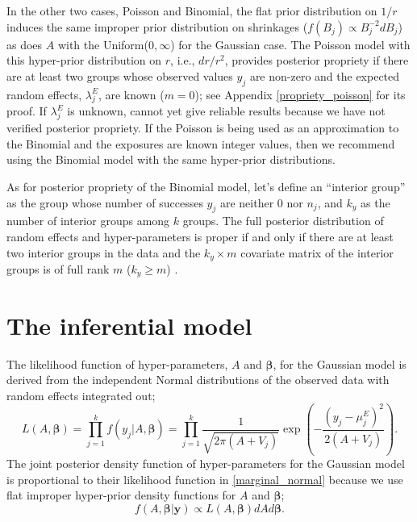 \documentclass[article]{jss}
\begin{document}
In the other two cases, Poisson and Binomial, the flat prior distribution on $1/r$ induces the same improper prior distribution on shrinkages ($f(B_{j})\propto B_{j}^{-2} d B_j$) as does $A$ with the Uniform($0, \infty$) for the Gaussian case. The Poisson model with this hyper-prior distribution on $r$, i.e., $dr/r^2$,  provides posterior propriety if there are at least two groups whose observed values $y_j$ are non-zero  and the expected random effects, $\lambda^E_j$, are known ($m=0$); see Appendix \ref{propriety_poisson} for its proof. If $\lambda^E_j$ is unknown,  cannot yet give reliable results because we have not verified posterior propriety.  If the Poisson is being used as an approximation to the Binomial and the exposures are known integer values, then we recommend using the Binomial model with the same hyper-prior distributions.

As for posterior propriety of the Binomial model, let's define an ``interior group'' as the group whose number of successes $y_j$ are neither 0 nor $n_j$, and $k_y$ as the number of interior groups among $k$ groups. The full posterior distribution of random effects and hyper-parameters is proper if and only if there are at least two interior groups in the data and the $k_y\times m$ covariate matrix of the interior groups is of full rank $m$ ($k_y\ge m$) \citep{tak2016propriety}. 



\section[Inference]{The inferential model}\label{inference}

The likelihood function of hyper-parameters, $A$ and $\boldsymbol{\beta}$, for the Gaussian  model is derived from the independent Normal distributions of the observed data with random effects integrated out; %
\begin{equation}\label{marginal_normal}
L(A, \boldsymbol{\boldsymbol{\beta}})=\prod_{j=1}^k f(y_j\vert A, \boldsymbol{\boldsymbol{\beta}})=\prod_{j=1}^k \frac{1}{\sqrt{2\pi (A+V_j)}}\exp\left(-\frac{(y_j-\mu^E_j)^2}{2(A+V_j)}\right).
\end{equation}
The joint posterior density  function of hyper-parameters for the Gaussian  model is proportional to their likelihood function in  \eqref{marginal_normal} because we use flat improper hyper-prior density functions for $A$ and $\boldsymbol{\beta}$;
\begin{equation}\label{marginal_post_normal}
f(A, \boldsymbol{\boldsymbol{\beta}}\vert \boldsymbol{y})\propto L(A, \boldsymbol{\boldsymbol{\beta}})dAd\boldsymbol{\beta}.
\end{equation}
\end{document}
